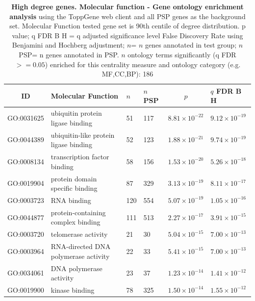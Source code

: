 \begin{table}[ht]
\centering
\begin{adjustbox}{width=\textwidth}
\setlength{\extrarowheight}{2pt}

\begin{tabular}{@{}clllcl@{}}
  \toprule
ID & Molecular Function & $n$ & $n$ PSP & $p$ & $q$ FDR B H \\ 
  \midrule
GO:0031625 & ubiquitin protein ligase binding & 51 & 117 & $8.81 \times 10^{-22}$ & $9.12 \times 10^{-19}$ \\ 
  GO:0044389 & ubiquitin-like protein ligase binding & 52 & 123 & $1.88 \times 10^{-21}$ & $9.74 \times 10^{-19}$ \\ 
  GO:0008134 & transcription factor binding & 58 & 156 & $1.53 \times 10^{-20}$ & $5.26 \times 10^{-18}$ \\ 
  GO:0019904 & protein domain specific binding & 87 & 329 & $3.13 \times 10^{-19}$ & $8.11 \times 10^{-17}$ \\ 
  GO:0003723 & RNA binding & 120 & 554 & $5.07 \times 10^{-19}$ & $1.05 \times 10^{-16}$ \\ 
  GO:0044877 & protein-containing complex binding & 111 & 513 & $2.27 \times 10^{-17}$ & $3.91 \times 10^{-15}$ \\ 
  GO:0003720 & telomerase activity & 21 & 30 & $5.04 \times 10^{-15}$ & $7.00 \times 10^{-13}$ \\ 
  GO:0003964 & RNA-directed DNA polymerase activity & 22 & 33 & $5.41 \times 10^{-15}$ & $7.00 \times 10^{-13}$ \\ 
  GO:0034061 & DNA polymerase activity & 23 & 37 & $1.23 \times 10^{-14}$ & $1.41 \times 10^{-12}$ \\ 
  GO:0019900 & kinase binding & 78 & 325 & $1.50 \times 10^{-14}$ & $1.55 \times 10^{-12}$ \\ 
   \bottomrule
\end{tabular}
\end{adjustbox}
\caption[Gene ontology Molecular Function enrichment of genes above 90th centile of degree distribution]{\textbf{High degree genes. Molecular function - Gene ontology enrichment analysis} using the ToppGene web client and all PSP genes as the background set.  Molecular Function tested gene set is 90th centile of degree distribution.  p value; q FDR B H = q adjusted significance level False Discovery Rate using Benjamini and Hochberg adjustment; $n$= $n$ genes annotated in test group; $n$ PSP= n genes annotated in PSP. $n$ ontology terms significantly (q FDR$>=0.05$) enriched for this centrality measure and ontology category (e.g. MF,CC,BP): 186} 
\label{tab:ToppGENE GO: Molecular Function. 90 centile cwpsp.txtp = p value; q FDR B H = q adjusted significance level False Discovery Rate using Benjamini and Hochberg adjustment; n= n genes annotated in test group; n PSP= n genes annotated in PSP. n significant in category 186}
\end{table}

